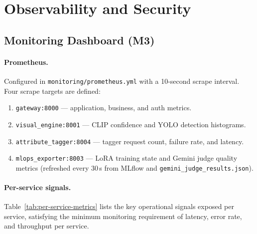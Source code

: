\documentclass[12pt]{article}
\begin{document}
\section{Observability and Security}

\subsection{Monitoring Dashboard (M3)}

\paragraph{Prometheus.}
Configured in \texttt{monitoring/prometheus.yml} with a 10-second scrape interval. Four scrape targets are defined:

\begin{enumerate}[leftmargin=*]
    \item \texttt{gateway:8000} --- application, business, and auth metrics.
    \item \texttt{visual\_engine:8001} --- CLIP confidence and YOLO detection histograms.
    \item \texttt{attribute\_tagger:8004} --- tagger request count, failure rate, and latency.
    \item \texttt{mlops\_exporter:8003} --- LoRA training state and Gemini judge quality metrics (refreshed every 30\,s from MLflow and \texttt{gemini\_judge\_results.json}).
\end{enumerate}

\paragraph{Per-service signals.} Table~\ref{tab:per-service-metrics} lists the key operational signals exposed per service, satisfying the minimum monitoring requirement of latency, error rate, and throughput per service.
\end{document}
